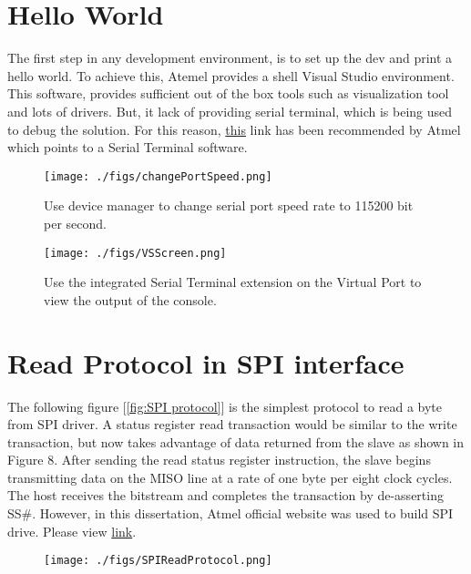 \documentclass{IEEEtran}
\begin{document}
\section{Hello World}
The first step in any development environment, is to set up the dev and print a hello world. To achieve this, Atemel provides a shell Visual Studio environment. This software, provides sufficient out of the box tools such as visualization tool and lots of drivers. But, it lack of providing serial terminal, which is being used to debug the solution. For this reason, \href{https://gallery.atmel.com/Products/Details/43e9ea03-72f7-4069-b0d4-9ac907cee81d}{this} link has been recommended by Atmel which points to a Serial Terminal software. 

\begin{figure}[h!]
\centering
\texttt{[image: ./figs/changePortSpeed.png]}
\caption{ Use device manager to change serial port speed rate to 115200 bit per second. }
\label{fig:Device Manager}
\end{figure}

\begin{figure}[h!]
\centering
\texttt{[image: ./figs/VSScreen.png]}
\caption{Use the integrated Serial Terminal extension on the Virtual Port to view the output of the console. }
\label{fig:Visual Studio}
\end{figure}

\section{Read Protocol in SPI interface}
The following  figure [\ref{fig:SPI protocol}] is the simplest protocol to read a byte from SPI driver. A status register read transaction would be similar to the write transaction, but now takes advantage of data returned from the slave as shown in Figure 8. After sending the read status register instruction, the slave begins transmitting data on the MISO line at a rate of one byte per eight clock cycles. The host receives the bitstream and completes the transaction by de-asserting SS#. However, in this dissertation, Atmel official website was used to build SPI drive. Please view \href{http://asf.atmel.com/docs/3.32.0/thirdparty.wireless.avr2025_mac.apps.mac.serial_if.bcn_ffd.ncp.sam4sd32c_reb233_xpro/html/sam_spi_quickstart.html} {link}. 

\begin{figure}[h!]
\centering
\texttt{[image: ./figs/SPIReadProtocol.png]}
\label{fig:Visual Studio}
\end{figure}
\end{document}
